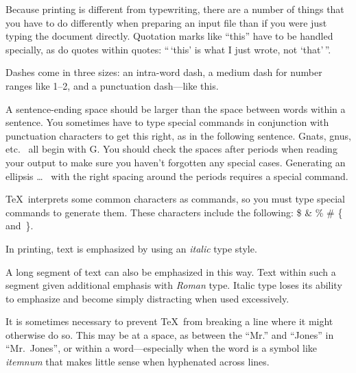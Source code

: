 \documentclass{kluwer}    %
\begin{document}
\begin{article}
Because printing is different from typewriting, there are a 
number of things that you have to do differently when preparing 
an input file than if you were just typing the document directly.  
Quotation marks like 
       ``this'' 
have to be handled specially, as do quotes within quotes: 
       ``\,`this'                  %
    is what I just 
    wrote, not  `that'\,''.  

Dashes come in three sizes: an 
       intra-word 
dash, a medium dash for number ranges like 
       1--2, 
and a punctuation 
       dash---like 
this.

A sentence-ending space should be larger than the space between words
within a sentence.  You sometimes have to type special commands in
conjunction with punctuation characters to get this right, as in the
following sentence.
       Gnats, gnus, etc.\    %
       all begin with G\@.   %
You should check the spaces after periods when reading your output to
make sure you haven't forgotten any special cases.
Generating an ellipsis 
       \ldots\    %
with the right spacing around the periods 
requires a special  command.  

\TeX\ interprets some common characters as commands, so you must type
special commands to generate them.  These characters include the
following: 
       \$ \& \% \# \{ and~\}.

In printing, text is emphasized by using an
       {\em italic\/}  %
type style.  

\begin{em}
   A long segment of text can also be emphasized in this way.  Text within
   such a segment given additional emphasis 
      with\/ {\em Roman} 
   type.  Italic type loses its ability to emphasize and become simply
   distracting when used excessively.  
\end{em}

It is sometimes necessary to prevent \TeX\ from breaking a line where
it might otherwise do so.  This may be at a space, as between the
``Mr.'' and ``Jones'' in
       ``Mr.~Jones'',        %
or within a word---especially when the word is a symbol like
       \mbox{\em itemnum\/} 
that makes little sense when hyphenated across 
       lines.






\end{article}
\end{document}
